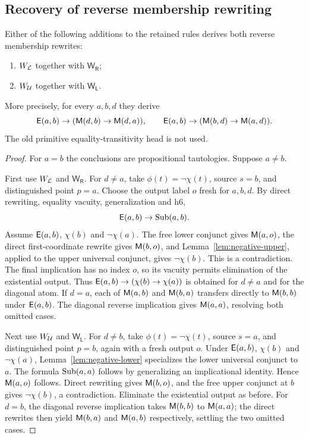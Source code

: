 \subsection{Recovery of reverse membership rewriting}

\begin{proposition}
\label{prop:reverse-repair}
Either of the following additions to the retained rules derives both
reverse membership rewrites:
\begin{enumerate}
 \item $W_{\mathcal L}$ together with $\mathsf{W_R}$;
 \item $W_{\mathcal U}$ together with $\mathsf{W_L}$.
\end{enumerate}
More precisely, for every $a,b,d$ they derive
\[
 \mathsf E(a,b)\to(\mathsf M(d,b)\to\mathsf M(d,a)),\qquad
 \mathsf E(a,b)\to(\mathsf M(b,d)\to\mathsf M(a,d)).
\]
The old primitive equality-transitivity head is not used.
\end{proposition}
\begin{proof}
For $a=b$ the conclusions are propositional tautologies. Suppose
$a\ne b$.

First use $W_{\mathcal L}$ and $\mathsf{W_R}$. For $d\ne a$, take
$\phi(t)=\neg\chi(t)$, source $s=b$, and distinguished point $p=a$.
Choose the output label $o$ fresh for $a,b,d$.
By direct rewriting, equality vacuity, generalization and h6,
\[
 \mathsf E(a,b)\to\operatorname{Sub}(a,b).
\]
Assume $\mathsf E(a,b)$, $\chi(b)$ and $\neg\chi(a)$. The free lower
conjunct gives $\mathsf M(a,o)$, the direct first-coordinate rewrite gives
$\mathsf M(b,o)$, and Lemma~\ref{lem:negative-upper}, applied to the upper
universal conjunct, gives $\neg\chi(b)$. This is a contradiction.
The final implication has no index $o$, so its vacuity permits
elimination of the existential output. Thus
$\mathsf E(a,b)\to(\chi(b)\to\chi(a))$ is obtained for $d\ne a$ and for
the diagonal atom.
If $d=a$, each of $\mathsf M(a,b)$ and $\mathsf M(b,a)$ transfers directly to
$\mathsf M(b,b)$ under $\mathsf E(a,b)$. The diagonal reverse implication gives
$\mathsf M(a,a)$, resolving both omitted cases.

Next use $W_{\mathcal U}$ and $\mathsf{W_L}$. For $d\ne b$, take
$\phi(t)=\neg\chi(t)$, source $s=a$, and distinguished point $p=b$,
again with a fresh output $o$. Under $\mathsf E(a,b)$, $\chi(b)$ and
$\neg\chi(a)$, Lemma~\ref{lem:negative-lower} specializes the lower
universal conjunct to $a$. The formula $\operatorname{Sub}(a,a)$ follows by
generalizing an implicational identity. Hence $\mathsf M(a,o)$ follows.
Direct rewriting gives $\mathsf M(b,o)$, and the free upper conjunct at
$b$ gives $\neg\chi(b)$, a contradiction. Eliminate the existential
output as before. For $d=b$, the diagonal reverse implication takes
$\mathsf M(b,b)$ to $\mathsf M(a,a)$; the direct rewrites then yield
$\mathsf M(b,a)$ and $\mathsf M(a,b)$ respectively, settling the two omitted
cases.
\end{proof}

